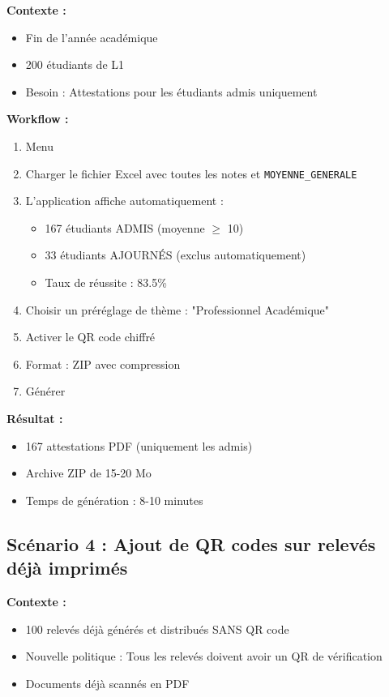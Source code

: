 \textbf{Contexte :}
\begin{itemize}[leftmargin=*]
    \item Fin de l'année académique
    \item 200 étudiants de L1
    \item Besoin : Attestations pour les étudiants admis uniquement
\end{itemize}

\textbf{Workflow :}

\begin{enumerate}[leftmargin=*]
    \item Menu 
    \item Charger le fichier Excel avec toutes les notes et \texttt{MOYENNE\_GENERALE}
    \item L'application affiche automatiquement :
    \begin{itemize}
        \item 167 étudiants ADMIS (moyenne $\geq$ 10)
        \item 33 étudiants AJOURNÉS (exclus automatiquement)
        \item Taux de réussite : 83.5\%
    \end{itemize}
    \item Choisir un préréglage de thème : "Professionnel Académique"
    \item Activer le QR code chiffré
    \item Format : ZIP avec compression
    \item Générer
\end{enumerate}

\textbf{Résultat :}
\begin{itemize}[leftmargin=*]
    \item 167 attestations PDF (uniquement les admis)
    \item Archive ZIP de 15-20 Mo
    \item Temps de génération : 8-10 minutes
\end{itemize}

\subsection{Scénario 4 : Ajout de QR codes sur relevés déjà imprimés}

\textbf{Contexte :}
\begin{itemize}[leftmargin=*]
    \item 100 relevés déjà générés et distribués SANS QR code
    \item Nouvelle politique : Tous les relevés doivent avoir un QR de vérification
    \item Documents déjà scannés en PDF
\end{itemize}


